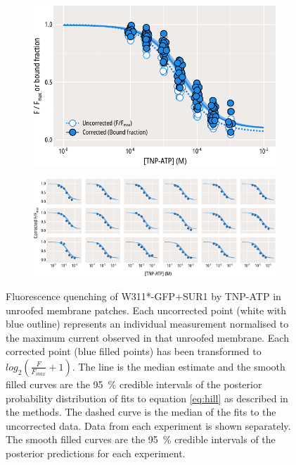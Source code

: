 \begin{figure}[hbtp]
	\centering
	\begin{subfigure}[t]{0.8\textwidth}
		\caption{}\label{ch3fig:tnpatp_quenching_1}
		\centering
		\includegraphics[width=\textwidth]{tnpatp_quenching_1.pdf}
	\end{subfigure}
	\vfill
	\begin{subfigure}[t]{0.9\textwidth}
		\caption{}\label{ch3fig:tnpatp_quenching_2}
		\centering
		\includegraphics[width=\textwidth]{tnpatp_quenching_2.pdf}
	\end{subfigure}
	\caption[W311*-GFP unroofed membrane binding]{
	 Fluorescence quenching of W311*-GFP+SUR1 by TNP-ATP in unroofed membrane patches.
	Each uncorrected point (white with blue outline) represents an individual measurement normalised to the maximum current observed in that unroofed membrane.
	Each corrected point (blue filled points) has been transformed to $log_2(\frac{F}{F_{max}}+1)$.
	The line is the median estimate and the smooth filled curves are the \SI{95}{\percent} credible intervals of the posterior probability distribution of fits to equation \ref{eq:hill} as described in the methods.
	The dashed curve is the median of the fits to the uncorrected data.
	 Data from each experiment is shown separately.
	The smooth filled curves are the \SI{95}{\percent} credible intervals of the posterior predictions for each experiment.
	}
\end{figure}

